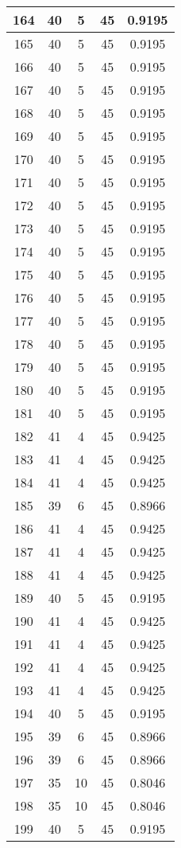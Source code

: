\documentclass[letterpaper, 12pt]{article}
\begin{document}
\begin{longtable}{|c|c|c|c|c|}
\hline
164 & 40 & 5 & 45 & 0.9195 \\
\hline
165 & 40 & 5 & 45 & 0.9195 \\
\hline
166 & 40 & 5 & 45 & 0.9195 \\
\hline
167 & 40 & 5 & 45 & 0.9195 \\
\hline
168 & 40 & 5 & 45 & 0.9195 \\
\hline
169 & 40 & 5 & 45 & 0.9195 \\
\hline
170 & 40 & 5 & 45 & 0.9195 \\
\hline
171 & 40 & 5 & 45 & 0.9195 \\
\hline
172 & 40 & 5 & 45 & 0.9195 \\
\hline
173 & 40 & 5 & 45 & 0.9195 \\
\hline
174 & 40 & 5 & 45 & 0.9195 \\
\hline
175 & 40 & 5 & 45 & 0.9195 \\
\hline
176 & 40 & 5 & 45 & 0.9195 \\
\hline
177 & 40 & 5 & 45 & 0.9195 \\
\hline
178 & 40 & 5 & 45 & 0.9195 \\
\hline
179 & 40 & 5 & 45 & 0.9195 \\
\hline
180 & 40 & 5 & 45 & 0.9195 \\
\hline
181 & 40 & 5 & 45 & 0.9195 \\
\hline
182 & 41 & 4 & 45 & 0.9425 \\
\hline
183 & 41 & 4 & 45 & 0.9425 \\
\hline
184 & 41 & 4 & 45 & 0.9425 \\
\hline
185 & 39 & 6 & 45 & 0.8966 \\
\hline
186 & 41 & 4 & 45 & 0.9425 \\
\hline
187 & 41 & 4 & 45 & 0.9425 \\
\hline
188 & 41 & 4 & 45 & 0.9425 \\
\hline
189 & 40 & 5 & 45 & 0.9195 \\
\hline
190 & 41 & 4 & 45 & 0.9425 \\
\hline
191 & 41 & 4 & 45 & 0.9425 \\
\hline
192 & 41 & 4 & 45 & 0.9425 \\
\hline
193 & 41 & 4 & 45 & 0.9425 \\
\hline
194 & 40 & 5 & 45 & 0.9195 \\
\hline
195 & 39 & 6 & 45 & 0.8966 \\
\hline
196 & 39 & 6 & 45 & 0.8966 \\
\hline
197 & 35 & 10 & 45 & 0.8046 \\
\hline
198 & 35 & 10 & 45 & 0.8046 \\
\hline
199 & 40 & 5 & 45 & 0.9195 \\
\hline
\end{longtable}
\end{document}

